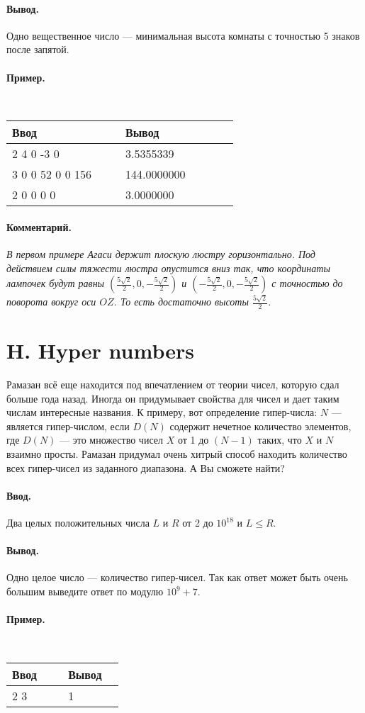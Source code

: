 \documentclass[12pt, a5paper]{article}
\newcommand{\informat}[1]
{
	\paragraph{Ввод.\\} #1
}
\newcommand{\outformat}[1]
{
	\paragraph{Вывод.\\} #1
}
\newcommand{\example}[2]
{
	\paragraph{Пример.\\}
	{\tt
	\begin{tabular}{|p{0.4\linewidth}|p{0.4\linewidth}|}
	\hline
	Ввод & Вывод \\
	\hline
	#1 & #2		\\
	\hline
	\end{tabular}
	}
}
\newcommand{\exampleee}[6]
{
	\paragraph{Пример.\\}
	{\tt
	\begin{tabular}{|p{0.4\linewidth}|p{0.4\linewidth}|}
	\hline
	Ввод 	& Вывод  	\\
	\hline
	#1 		& #2 		\\
	\hline
	#3		& #4		\\
	\hline
	#5		& #6		\\
	\hline
	\end{tabular}
	}
}
\newcommand{\excomm}[1]
{
	\paragraph{Комментарий. \\}
	\textit{#1}
}
\begin{document}
\outformat{Одно вещественное число --- минимальная высота комнаты с точностью 5 знаков после запятой.}

\exampleee{
2 \newline
3 4 0 \newline
4 -3 0
}
{3.5355339}
{3 \newline
39 0 0 \newline
0 52 0 \newline
0 0 156
}
{144.0000000}
{2 \newline
1 0 0 \newline
-2 0 0
}
{3.0000000}

\excomm{В первом примере Агаси держит плоскую люстру горизонтально. Под действием силы тяжести люстра опустится вниз так, что координаты лампочек будут равны $\left(\frac{5 \sqrt{2}}{2}, 0, -\frac{5 \sqrt{2}}{2} \right)$ и $\left(-\frac{5 \sqrt{2}}{2}, 0, -\frac{5 \sqrt{2}}{2} \right)$ с точностью до поворота вокруг оси $OZ$. То есть достаточно высоты $\frac{5 \sqrt{2}}{2}$.}






\section*{H. Hyper numbers}
 

Рамазан всё еще находится под впечатлением от теории чисел, которую сдал больше года назад. Иногда он придумывает свойства для чисел и дает таким числам интересные названия. К примеру, вот определение гипер-числа: $N$ --- является гипер-числом, если $D(N)$ содержит нечетное количество элементов, где $D(N)$ --- это множество чисел $X$ от 1 до $(N-1)$ таких, что $X$ и $N$ взаимно просты. Рамазан придумал очень хитрый способ находить количество всех гипер-чисел из заданного диапазона. А Вы сможете найти?

\informat{Два целых положительных числа $L$ и $R$ от 2 до $10^{18}$ и $L \leqslant R$.}

\outformat{Одно целое число --- количество гипер-чисел. Так как ответ может быть очень большим выведите ответ по модулю $10^9+7$.}

\example{2 3}{1}
\end{document}
